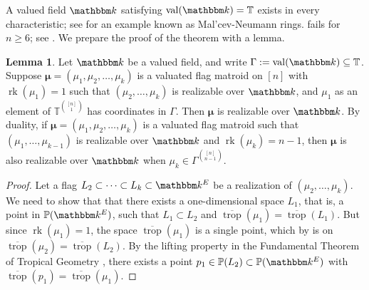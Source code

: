 \documentclass[11pt]{amsart}
\newcommand{\PP}{\mathbb P}
\newcommand{\TT}{\mathbb T}
\newcommand{\trop}{\operatorname{trop}}
\newcommand{\kk}{\mathbbm k}
\theoremstyle{definition}
\newtheorem{lem}[thm]{Lemma}
\newcommand{\madeline}[1]{{\color{magenta} \sf  Madeline: [#1]}}
\newcommand{\leon}[1]{{\color{teal} \sf Leon: [#1]}}
\newcommand{\chris}[1]{{\color{cyan} \sf Chris: [#1]}}
\begin{document}
A valued field $\kk$ satisfying $\operatorname{val}(\kk) = \TT$ exists in every characteristic; see \cite[\S3]{Poo93} for an example known as Mal'cev-Neumann rings.   fails for $n\geq 6$; see .
We prepare the proof of the theorem with a lemma.  
\begin{lem}\label{lem:real}
Let $\kk$ be a valued field, and write $\Gamma := \operatorname{val}(\kk) \subseteq \TT$. Suppose ${\boldsymbol \mu} = (\mu_1, \mu_2, \ldots, \mu_k)$ is a valuated flag matroid on $[n]$ with $\operatorname{rk}(\mu_1) = 1$ such that $(\mu_2, \ldots, \mu_{k})$ is realizable over $\kk$, and $\mu_1$ as an element of $\TT^{\binom{[n]}{1}}$ has coordinates in $\Gamma$.  Then ${\boldsymbol \mu}$ is realizable over $\kk$.  By duality, if ${\boldsymbol \mu} = (\mu_1, \mu_2, \ldots, \mu_k)$ is a valuated flag matroid such that $(\mu_1, \ldots, \mu_{k-1})$ is realizable over $\kk$ and $\operatorname{rk}(\mu_{k}) = n-1$, then ${\boldsymbol \mu}$ is also realizable over $\kk$ when $\mu_k \in \Gamma^{\binom{[n]}{n-1}}$. %
\end{lem}

\begin{proof}
Let a flag $ L_2 \subset \cdots \subset L_{k}\subset \kk^E $ be a realization of $(\mu_2, \ldots, \mu_{k})$.  We need to show that that there exists a one-dimensional space $L_1$, that is, a point in $\PP(\kk^E)$, such that $L_1\subset L_{2}$ and $\overline{\trop}(\mu_1) = \overline{\trop}(L_1)$.  But since $\operatorname{rk}(\mu_1) = 1$, the space $\overline{\trop}(\mu_1)$ is a single point, which by  is on $\overline{\trop}(\mu_{2}) = \overline{\trop}(L_{2})$.  By the lifting property in the Fundamental Theorem of Tropical Geometry \cite[Theorem 3.2.3, Theorem 6.2.15]{MS15}, there exists a point $p_1\in \PP(L_{2}) \subset \PP(\kk^E)$ with $\overline{\trop}(p_1) = \overline{\trop}(\mu_1)$.
\end{proof}
\end{document}
